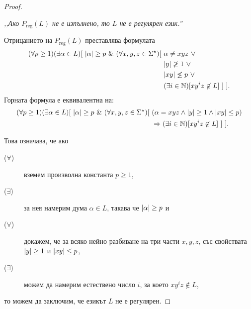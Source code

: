\begin{proof}
  \begin{center}
    {\em ,,Ако $P_{\text{reg}}(L)$ не е изпълнено, то $L$ не е регулярен език.''}
  \end{center}
  Отрицанието на $P_{\text{reg}}(L)$ преставлява формулата
  \begin{align*}
    (\forall p \geq 1)(\exists \alpha \in L)[\ \abs{\alpha} \geq p\ \&\ (\forall x,y,z\in\Sigma^\star)[\ & \alpha \neq xyz\ \vee\\
                                                                                                         & \abs{y} \not\geq 1\ \vee\\
                                                                                                         & \abs{xy} \not\leq p\ \vee\\
                                                                                                         & (\exists i\in\Nat)[xy^iz \not\in L]\ ]\ ].
  \end{align*}
  Горната формула е еквивалентна на:
  \begin{align*}
    (\forall p \geq 1)(\exists \alpha \in L)[\ \abs{\alpha} \geq p\ \&\ (\forall x,y,z\in\Sigma^\star)[\ & (\alpha = xyz \wedge \abs{y} \geq 1\wedge \abs{xy} \leq p)\\
                                                                                                         & \Rightarrow (\exists i\in\Nat)[xy^iz \not\in L]\ ]\ ].
  \end{align*}

  Това означава, че ако
  \begin{description}
  \item[($\forall$)]
    вземем произволна константа $p \geq 1$,
  \item[($\exists$)]
    за нея намерим дума $\alpha \in L$, такава че $\lvert{\alpha}\rvert \geq p$ и 
  \item[($\forall$)]
    докажем, че за всяко нейно разбиване на три части $x,y,z$, със свойствата
    $\lvert{y}\rvert \geq 1$ и $\lvert{xy}\rvert \leq p$,
  \item[($\exists$)]
    можем да намерим естествено число $i$, за което $xy^iz \not\in L$,
  \end{description}
  то можем да заключим, че езикът $L$ не е регулярен.
\end{proof}

